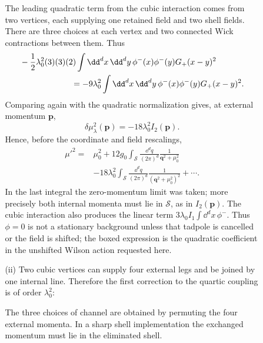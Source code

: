 \begin{enumerate}
\begin{enumerate}
\begin{enumerate}
      The leading quadratic term from the cubic interaction comes from two
      vertices, each supplying one retained field and two shell fields.
      There are three choices at each vertex and two connected Wick
      contractions between them.  Thus
      \[
        \begin{aligned}
        &-\frac12\lambda_0^2(3)(3)(2)
          \int \dd^dx\,\dd^dy\,
            \phi^-(x)\phi^-(y)G_+(x-y)^2\\
        &\hspace{22mm}
          =-9\lambda_0^2\int \dd^dx\,\dd^dy\,
            \phi^-(x)\phi^-(y)G_+(x-y)^2.
        \end{aligned}
      \]
      Comparing again with the quadratic normalization gives, at external
      momentum \(\mathbf p\),
      \[
        \delta\mu_\lambda^2(\mathbf p)
          =-18\lambda_0^2I_2(\mathbf p).
      \]
      Hence, before the coordinate and field rescalings,
      \[
        \boxed{\begin{aligned}
          \mu'^2={}&\mu_0^2
            +12g_0\int_{\mathcal S}\frac{\dd^dq}{(2\pi)^d}
              \frac{1}{\mathbf q^2+\mu_0^2}\\
          &-18\lambda_0^2
            \int_{\mathcal S}\frac{\dd^dq}{(2\pi)^d}
              \frac{1}{(\mathbf q^2+\mu_0^2)^2}
            +\cdots.
        \end{aligned}}
      \]
      In the last integral the zero-momentum limit was taken; more
      precisely both internal momenta must lie in \(\mathcal S\), as in
      \(I_2(\mathbf p)\).  The cubic interaction also produces the linear
      term \(3\lambda_0I_1\int \dd^dx\,\phi^-\).  Thus \(\phi=0\) is not a
      stationary background unless that tadpole is cancelled or the field
      is shifted; the boxed expression is the quadratic coefficient in the
      unshifted Wilson action requested here.

      \item[(ii)] Two cubic vertices can supply four external legs and be
      joined by one internal line.  Therefore the first correction to the
      quartic coupling is of order \(\lambda_0^2\):
      \begin{center}
      \end{center}
      The three choices of channel are obtained by permuting the four
      external momenta.  In a sharp shell implementation the exchanged
      momentum must lie in the eliminated shell.


\end{enumerate}
\end{enumerate}
\end{enumerate}
